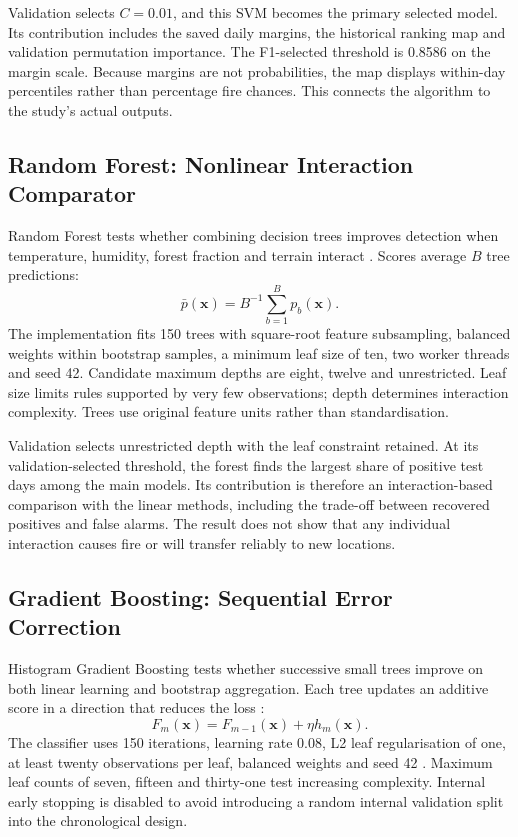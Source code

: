 \documentclass[conference,a4paper]{IEEEtran}
\begin{document}
Validation selects $C=0.01$, and this SVM becomes the primary selected model. Its contribution includes the saved daily margins, the historical ranking map and validation permutation importance. The F1-selected threshold is 0.8586 on the margin scale. Because margins are not probabilities, the map displays within-day percentiles rather than percentage fire chances. This connects the algorithm to the study's actual outputs.

\subsection{Random Forest: Nonlinear Interaction Comparator}
Random Forest tests whether combining decision trees improves detection when temperature, humidity, forest fraction and terrain interact \citep{breiman}. Scores average $B$ tree predictions:
\begin{equation}
\bar p(\mathbf x)=B^{-1}\sum_{b=1}^{B}p_b(\mathbf x).
\end{equation}
The implementation fits 150 trees with square-root feature subsampling, balanced weights within bootstrap samples, a minimum leaf size of ten, two worker threads and seed 42. Candidate maximum depths are eight, twelve and unrestricted. Leaf size limits rules supported by very few observations; depth determines interaction complexity. Trees use original feature units rather than standardisation.

Validation selects unrestricted depth with the leaf constraint retained. At its validation-selected threshold, the forest finds the largest share of positive test days among the main models. Its contribution is therefore an interaction-based comparison with the linear methods, including the trade-off between recovered positives and false alarms. The result does not show that any individual interaction causes fire or will transfer reliably to new locations.

\subsection{Gradient Boosting: Sequential Error Correction}
Histogram Gradient Boosting tests whether successive small trees improve on both linear learning and bootstrap aggregation. Each tree updates an additive score in a direction that reduces the loss \citep{friedman}:
\begin{equation}
F_m(\mathbf x)=F_{m-1}(\mathbf x)+\eta h_m(\mathbf x).
\end{equation}
The classifier uses 150 iterations, learning rate 0.08, L2 leaf regularisation of one, at least twenty observations per leaf, balanced weights and seed 42 \citep{sklearnboost}. Maximum leaf counts of seven, fifteen and thirty-one test increasing complexity. Internal early stopping is disabled to avoid introducing a random internal validation split into the chronological design.
\end{document}
